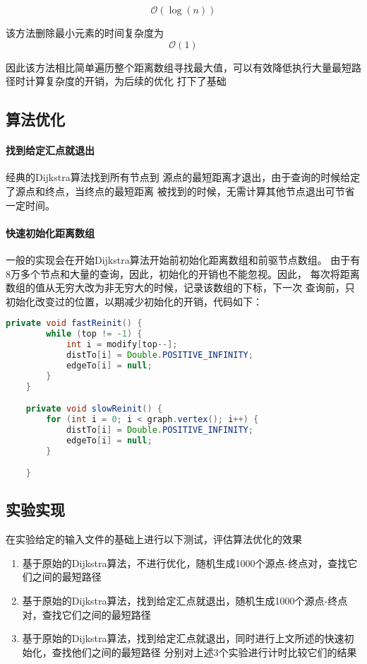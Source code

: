 \documentclass[12pt,a4paper]{ctexart}
\begin{document}
\begin{equation}
    \nonumber
    \mathcal{O}{(\log(n))}
\end{equation}

该方法删除最小元素的时间复杂度为
\begin{equation}
    \nonumber
    \mathcal{O} {(1)}
\end{equation}


因此该方法相比简单遍历整个距离数组寻找最大值，可以有效降低执行大量最短路径时计算复杂度的开销，为后续的优化
打下了基础

\subsection{算法优化}

\paragraph{找到给定汇点就退出} 经典的Dijkstra算法找到所有节点到
源点的最短距离才退出，由于查询的时候给定了源点和终点，当终点的最短距离
被找到的时候，无需计算其他节点退出可节省一定时间。

\paragraph{快速初始化距离数组}
一般的实现会在开始Dijkstra算法开始前初始化距离数组和前驱节点数组。
由于有8万多个节点和大量的查询，因此，初始化的开销也不能忽视。因此，
每次将距离数组的值从无穷大改为非无穷大的时候，记录该数组的下标，下一次
查询前，只初始化改变过的位置，以期减少初始化的开销，代码如下：

\begin{lstlisting}[basicstyle=\ttfamily,caption=map-routing/Dijkstra.java,language=java,showstringspaces=false,firstnumber=105]
    private void fastReinit() {
        while (top != -1) {
            int i = modify[top--];
            distTo[i] = Double.POSITIVE_INFINITY;
            edgeTo[i] = null;
        }
    }

    private void slowReinit() {
        for (int i = 0; i < graph.vertex(); i++) {
            distTo[i] = Double.POSITIVE_INFINITY;
            edgeTo[i] = null;
        }

    }
\end{lstlisting}

\subsection{实验实现}
在实验给定的输入文件的基础上进行以下测试，评估算法优化的效果
\begin{enumerate}
    \item 基于原始的Dijkstra算法，不进行优化，随机生成1000个源点-终点对，查找它们之间的最短路径
    \item 基于原始的Dijkstra算法，找到给定汇点就退出，随机生成1000个源点-终点对，查找它们之间的最短路径
    \item 基于原始的Dijkstra算法，找到给定汇点就退出，同时进行上文所述的快速初始化，查找他们之间的最短路径
          分别对上述3个实验进行计时比较它们的结果
\end{enumerate}
\end{document}
